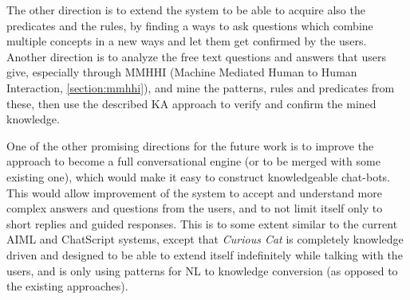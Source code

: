 The other direction is to extend the system to be able to acquire also the
predicates and the rules, by finding a ways to ask questions which combine 
multiple concepts in a new ways and let them get confirmed by the users. 
Another direction is to analyze the free text questions and answers that users
give, especially through MMHHI (Machine Mediated Human to Human Interaction, 
\autoref{section:mmhhi}), and mine the patterns,
rules and predicates from these, then use the described KA approach to verify
and confirm the mined knowledge.

One of the other promising directions for the future work is to improve the
approach to become a full conversational engine (or to be merged with some 
existing one), which would make it easy to construct knowledgeable chat-bots. 
This would allow improvement of the system to accept and understand more 
complex answers and questions from the users, and to not limit itself only to 
short replies and guided responses. This is to some extent similar to the 
current AIML and ChatScript systems, except that \emph{Curious Cat} is 
completely knowledge driven and designed to be able to extend itself 
indefinitely while talking with the users, and is only using patterns for NL 
to knowledge conversion (as opposed to the existing approaches). 

